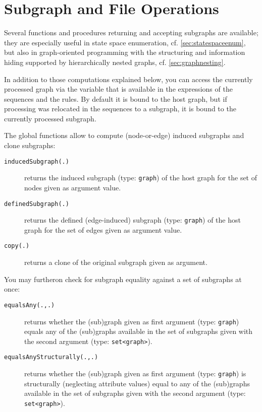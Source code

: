 \section{Subgraph and File Operations}\label{sec:subgraphop}

Several functions and procedures returning and accepting subgraphs are available;
they are especially useful in state space enumeration, cf. \ref{sec:statespaceenum}, but also in graph-oriented programming with the structuring and information hiding supported by hierarchically nested graphs, cf. \ref{sec:graphnesting}.

In addition to those computations explained below, you can access the currently processed graph via the  \texttt{} variable that is available in the expressions of the sequences and the rules. 
By default it is bound to the host graph, but if processing was relocated in the sequences to a subgraph, it is bound to the currently processed subgraph.

The global functions allow to compute (node-or-edge) induced subgraphs and clone subgraphs:

\begin{description}
\item[\texttt{inducedSubgraph(.)}] returns the induced subgraph (type: \texttt{graph}) of the host graph for the set of nodes given as argument value.
\item[\texttt{definedSubgraph(.)}] returns the defined (edge-induced) subgraph (type: \texttt{graph}) of the host graph for the set of edges given as argument value.
\item[\texttt{copy(.)}] returns a clone of the original subgraph given as argument.
\end{description}

You may furtheron check for subgraph equality against a set of subgraphs at once:

\begin{description}
\item[\texttt{equalsAny(.,.)}] returns whether the (sub)graph given as first argument (type: \texttt{graph}) equals any of the (sub)graphs available in the set of subgraphs given with the second argument (type: \texttt{set<graph>}).
\item[\texttt{equalsAnyStructurally(.,.)}] returns whether the (sub)graph given as first argument (type: \texttt{graph}) is structurally (neglecting attribute values) equal to any of the (sub)graphs available in the set of subgraphs given with the second argument (type: \texttt{set<graph>}).
\end{description}

